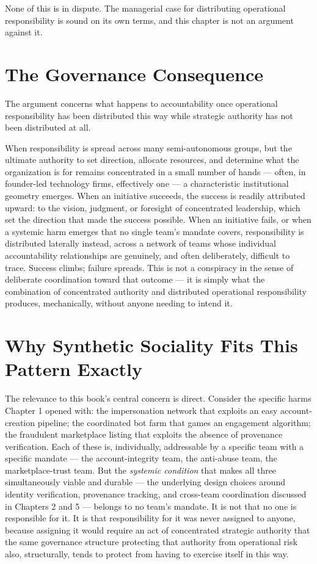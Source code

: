 \documentclass[12pt,a4paper]{book}
\begin{document}
None of this is in dispute. The managerial case for distributing operational responsibility is sound on its own terms, and this chapter is not an argument against it.

\section{The Governance Consequence}

The argument concerns what happens to accountability once operational responsibility has been distributed this way while strategic authority has not been distributed at all.

When responsibility is spread across many semi-autonomous groups, but the ultimate authority to set direction, allocate resources, and determine what the organization is for remains concentrated in a small number of hands — often, in founder-led technology firms, effectively one — a characteristic institutional geometry emerges. When an initiative succeeds, the success is readily attributed upward: to the vision, judgment, or foresight of concentrated leadership, which set the direction that made the success possible. When an initiative fails, or when a systemic harm emerges that no single team's mandate covers, responsibility is distributed laterally instead, across a network of teams whose individual accountability relationships are genuinely, and often deliberately, difficult to trace. Success climbs; failure spreads. This is not a conspiracy in the sense of deliberate coordination toward that outcome — it is simply what the combination of concentrated authority and distributed operational responsibility produces, mechanically, without anyone needing to intend it.

\section{Why Synthetic Sociality Fits This Pattern Exactly}

The relevance to this book's central concern is direct. Consider the specific harms Chapter 1 opened with: the impersonation network that exploits an easy account-creation pipeline; the coordinated bot farm that games an engagement algorithm; the fraudulent marketplace listing that exploits the absence of provenance verification. Each of these is, individually, addressable by a specific team with a specific mandate — the account-integrity team, the anti-abuse team, the marketplace-trust team. But the \emph{systemic condition} that makes all three simultaneously viable and durable — the underlying design choices around identity verification, provenance tracking, and cross-team coordination discussed in Chapters 2 and 5 — belongs to no team's mandate. It is not that no one is responsible for it. It is that responsibility for it was never assigned to anyone, because assigning it would require an act of concentrated strategic authority that the same governance structure protecting that authority from operational risk also, structurally, tends to protect from having to exercise itself in this way.
\end{document}
